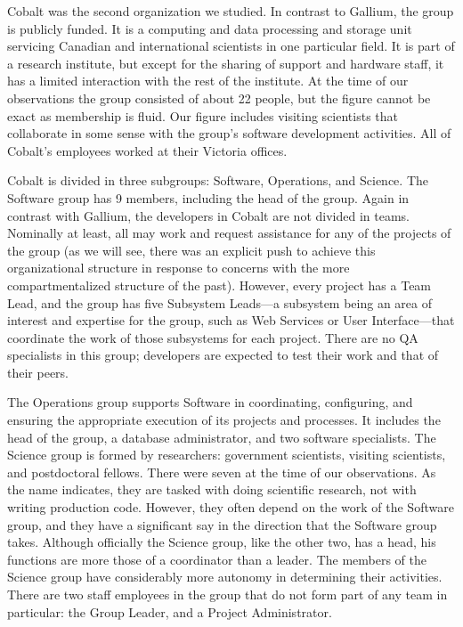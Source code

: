 \documentclass[10pt, conference, compsocconf]{IEEEtran}
\begin{document}
Cobalt was the second organization we studied. In contrast to Gallium, the group is publicly funded. It is a computing and data processing and storage unit servicing Canadian and international scientists in one particular field. It is part of a research institute, but except for the sharing of support and hardware staff, it has a limited interaction with the rest of the institute. At the time of our observations the group consisted of about 22 people, but the figure cannot be exact as membership is fluid. Our figure includes visiting scientists that collaborate in some sense with the group's software development activities. All of Cobalt's employees worked at their Victoria offices.

Cobalt is divided in three subgroups: Software, Operations, and Science. The Software group has 9 members, including the head of the group. Again in contrast with Gallium, the developers in Cobalt are not divided in teams. Nominally at least, all may work and request assistance for any of the projects of the group (as we will see, there was an explicit push to achieve this organizational structure in response to concerns with the more compartmentalized structure of the past). However, every project has a Team Lead, and the group has five Subsystem Leads---a subsystem being an area of interest and expertise for the group, such as Web Services or User Interface---that coordinate the work of those subsystems for each project. There are no QA specialists in this group; developers are expected to test their work and that of their peers.

The Operations group supports Software in coordinating, configuring, and ensuring the appropriate execution of its projects and processes. It includes the head of the group, a database administrator, and two software specialists. The Science group is formed by researchers: government scientists, visiting scientists, and postdoctoral fellows. There were seven at the time of our observations. As the name indicates, they are tasked with doing scientific research, not with writing production code. However, they often depend on the work of the Software group, and they have a significant say in the direction that the Software group takes. Although officially the Science group, like the other two, has a head, his functions are more those of a coordinator than a leader. The members of the Science group have considerably more autonomy in determining their activities. There are two staff employees in the group that do not form part of any team in particular: the Group Leader, and a Project Administrator.
\end{document}
